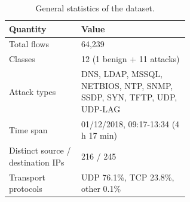 \begin{table}[htbp]
\centering
\caption{General statistics of the dataset.}
\label{tab:summary}
\begin{tabular}{lp{0.6\linewidth}}
\toprule
Quantity & Value \\
\midrule
Total flows & 64,239 \\
Classes & 12 (1 benign + 11 attacks) \\
Attack types & DNS, LDAP, MSSQL, NETBIOS, NTP, SNMP, SSDP, SYN, TFTP, UDP, UDP-LAG \\
Time span & 01/12/2018, 09:17-13:34 (4 h 17 min) \\
Distinct source / destination IPs & 216 / 245 \\
Transport protocols & UDP 76.1\%, TCP 23.8\%, other 0.1\% \\
\bottomrule
\end{tabular}
\end{table}
